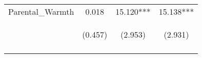 \begin{tabular}{lccc}
\noalign{\smallskip}Parental_Warmth & 0.018 & 15.120*** & 15.138***\\
 & \begin{footnotesize}(0.457)\end{footnotesize} & \begin{footnotesize}(2.953)\end{footnotesize} & \begin{footnotesize}(2.931)\end{footnotesize}\\
\noalign{\smallskip}\hline\end{tabular}\\
